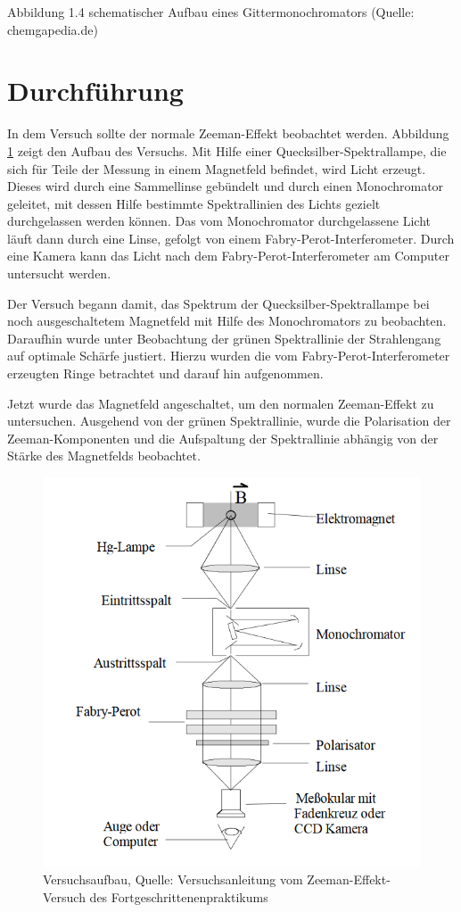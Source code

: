 \documentclass[10pt,a4paper]{article}
\begin{document}
Abbildung 1.4 schematischer Aufbau eines Gittermonochromators (Quelle: chemgapedia.de)

\section{Durchführung}

In dem Versuch sollte der normale Zeeman-Effekt beobachtet werden. Abbildung \ref{aufbau} zeigt den Aufbau des Versuchs. Mit Hilfe einer Quecksilber-Spektrallampe, die sich für Teile der Messung in einem Magnetfeld befindet, wird Licht erzeugt. Dieses wird durch eine Sammellinse gebündelt und durch einen Monochromator geleitet, mit dessen Hilfe bestimmte Spektrallinien des Lichts gezielt durchgelassen werden können. Das vom Monochromator durchgelassene Licht läuft dann durch eine Linse, gefolgt von einem Fabry-Perot-Interferometer. Durch eine Kamera kann das Licht nach dem Fabry-Perot-Interferometer am Computer untersucht werden. 

Der Versuch begann damit, das Spektrum der Quecksilber-Spektrallampe bei noch ausgeschaltetem Magnetfeld mit Hilfe des Monochromators zu beobachten. Daraufhin wurde unter Beobachtung der grünen Spektrallinie der Strahlengang auf optimale Schärfe justiert. Hierzu wurden die vom Fabry-Perot-Interferometer erzeugten Ringe betrachtet und darauf hin aufgenommen.

Jetzt wurde das Magnetfeld angeschaltet, um den normalen Zeeman-Effekt zu untersuchen. Ausgehend von der grünen Spektrallinie, wurde die Polarisation der Zeeman-Komponenten und die Aufspaltung der Spektrallinie abhängig von der Stärke des Magnetfelds beobachtet.

\begin{figure}[h]
	\includegraphics[scale = 1]{Zeeman_aufbau.png}
	\centering
	\caption{Versuchsaufbau, Quelle: Versuchsanleitung vom Zeeman-Effekt-Versuch des Fortgeschrittenenpraktikums}
	\label{aufbau}
\end{figure}
\end{document}
